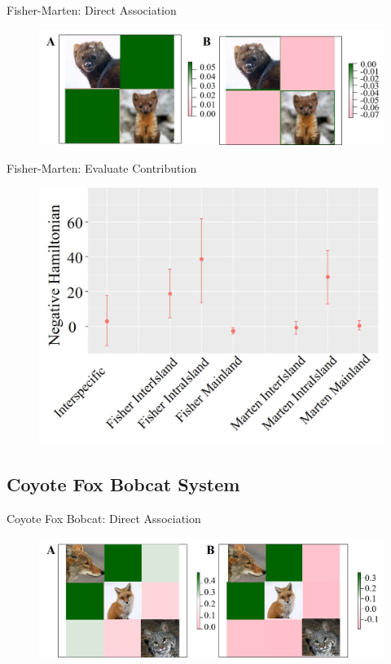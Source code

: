 \documentclass{beamer}
\begin{document}
\begin{frame}{Fisher-Marten: Direct Association}
\begin{figure}[ht]
			\centering
			\includegraphics[scale=.35]{fig/APIS/FM/FM.jpg}
			\label{FM}
		\end{figure}
\end{frame}


\begin{frame}{Fisher-Marten: Evaluate Contribution}
\begin{figure}[ht]
			\centering
			\includegraphics[scale=.4]{fig/APIS/FM/FM_Hamiltonian.jpg}
			\label{FM_H	}
\end{figure}
\end{frame}

\subsection{Coyote Fox Bobcat System}
\begin{frame}{Coyote Fox Bobcat: Direct Association}
\begin{figure}[ht]
			\centering
			\includegraphics[scale=.35]{fig/APIS/CFB/CFB.jpg}
			\label{CFB}
		\end{figure}
\end{frame}
\end{document}
